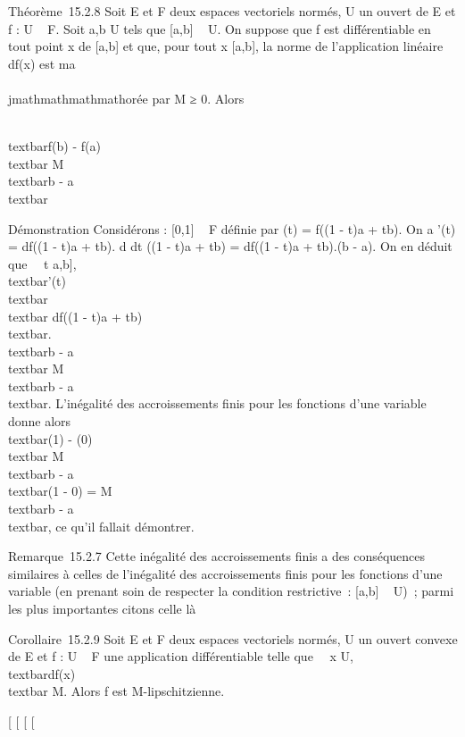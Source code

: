 Théorème~15.2.8 Soit E et F deux espaces vectoriels normés, U un ouvert
de E et f : U \rightarrow~ F. Soit a,b \in U tels que {[}a,b{]} \subset~ U. On suppose que f
est différentiable en tout point x de {[}a,b{]} et que, pour tout x \in
{[}a,b{]}, la norme de l'application linéaire df(x) est ma\\\\jmathmathmathmathorée par M ≥
0. Alors

\\textbar{}f(b) - f(a)\\textbar{} \leq
M\\textbar{}b - a\\textbar{}

Démonstration Considérons \phi : {[}0,1{]} \rightarrow~ F définie par \phi(t) = f((1 -
t)a + tb). On a \phi'(t) = df((1 - t)a + tb). d \over dt
((1 - t)a + tb) = df((1 - t)a + tb).(b - a). On en déduit que
\forall~~t \in {[}a,b{]},
\\textbar{}\phi'(t)\\textbar{}
\leq\\textbar{} df((1 - t)a +
tb)\\textbar{}.\\textbar{}b -
a\\textbar{} \leq M\\textbar{}b -
a\\textbar{}. L'inégalité des accroissements finis pour
les fonctions d'une variable donne alors \\textbar{}\phi(1)
- \phi(0)\\textbar{} \leq M\\textbar{}b -
a\\textbar{}(1 - 0) = M\\textbar{}b -
a\\textbar{}, ce qu'il fallait démontrer.

Remarque~15.2.7 Cette inégalité des accroissements finis a des
conséquences similaires à celles de l'inégalité des accroissements finis
pour les fonctions d'une variable (en prenant soin de respecter la
condition restrictive~: {[}a,b{]} \subset~ U)~; parmi les plus importantes
citons celle là

Corollaire~15.2.9 Soit E et F deux espaces vectoriels normés, U un
ouvert convexe de E et f : U \rightarrow~ F une application différentiable telle
que \forall~~x \in U,
\\textbar{}df(x)\\textbar{} \leq M. Alors f
est M-lipschitzienne.

{[}
{[}
{[}
{[}
